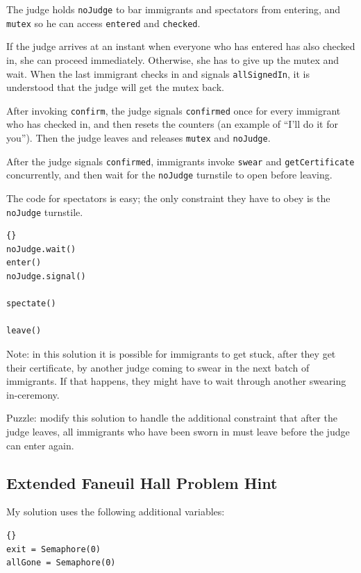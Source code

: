 \documentclass{book}
\newcommand{\clearemptydoublepage}{\newpage\cleardoublepage}
\begin{document}
The judge holds {\tt noJudge} to bar immigrants and spectators
from entering, and {\tt mutex} so he can access {\tt entered}
and {\tt checked}.

If the judge arrives at an instant when everyone who has
entered has also checked in, she can proceed immediately.  Otherwise,
she has to give up the mutex and wait.  When the last immigrant
checks in and signals {\tt allSignedIn}, it is understood that the
judge will get the mutex back.

After invoking {\tt confirm}, the judge signals {\tt confirmed}
once for every immigrant who has checked in, and then resets
the counters (an example of ``I'll do it for you'').
Then the judge leaves and releases {\tt mutex} and {\tt noJudge}.

After the judge signals {\tt confirmed}, immigrants invoke
{\tt swear} and {\tt getCertificate} concurrently, and then
wait for the {\tt noJudge} turnstile to open before leaving.

The code for spectators is easy; the only constraint they have
to obey is the {\tt noJudge} turnstile.

\begin{lstlisting}[title={Faneuil Hall problem solution (spectator)}]{}
noJudge.wait()
enter()
noJudge.signal()

spectate()

leave()
\end{lstlisting}

Note: in this solution it is possible for immigrants to get stuck,
after they get their certificate, by another judge coming to swear
in the next batch of immigrants.  If that happens, they might have
to wait through another swearing in-ceremony.

Puzzle: modify this solution to handle the additional constraint
that after the judge leaves, all immigrants who have been sworn
in must leave before the judge can enter again.


\clearemptydoublepage
\subsection {Extended Faneuil Hall Problem Hint}

My solution uses the following additional variables:

\begin{lstlisting}[title={Faneuil Hall problem hint}]{}
exit = Semaphore(0)
allGone = Semaphore(0)
\end{lstlisting}
\end{document}
